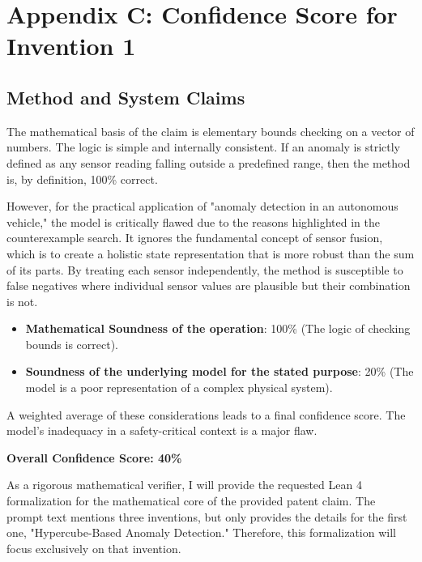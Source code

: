 \documentclass{article}
\begin{document}
\section{Appendix C: Confidence Score for Invention 1}

\subsection{Method and System Claims}
The mathematical basis of the claim is elementary bounds checking on a vector of numbers. The logic is simple and internally consistent. If an anomaly is strictly defined as any sensor reading falling outside a predefined range, then the method is, by definition, 100\% correct.

However, for the practical application of "anomaly detection in an autonomous vehicle," the model is critically flawed due to the reasons highlighted in the counterexample search. It ignores the fundamental concept of sensor fusion, which is to create a holistic state representation that is more robust than the sum of its parts. By treating each sensor independently, the method is susceptible to false negatives where individual sensor values are plausible but their combination is not.

\begin{itemize}
    \item \textbf{Mathematical Soundness of the operation}: 100\% (The logic of checking bounds is correct).
    \item \textbf{Soundness of the underlying model for the stated purpose}: 20\% (The model is a poor representation of a complex physical system).
\end{itemize}

A weighted average of these considerations leads to a final confidence score. The model's inadequacy in a safety-critical context is a major flaw.

\textbf{Overall Confidence Score: 40\%}


As a rigorous mathematical verifier, I will provide the requested Lean 4 formalization for the mathematical core of the provided patent claim. The prompt text mentions three inventions, but only provides the details for the first one, "Hypercube-Based Anomaly Detection." Therefore, this formalization will focus exclusively on that invention.
\end{document}
